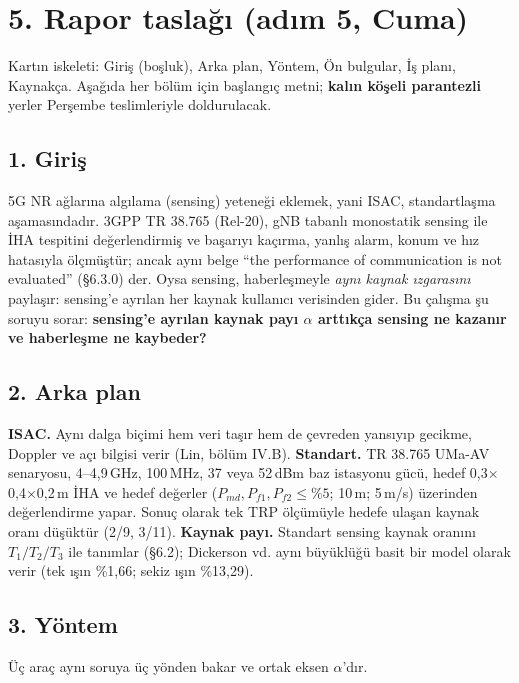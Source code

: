 \documentclass[10.5pt,a4paper]{article}
\begin{document}
\section*{5. Rapor taslağı (adım 5, Cuma)}
Kartın iskeleti: Giriş (boşluk), Arka plan, Yöntem, Ön bulgular, İş planı, Kaynakça. Aşağıda her bölüm için başlangıç metni; \textbf{kalın köşeli parantezli} yerler Perşembe teslimleriyle doldurulacak.

\subsection*{1. Giriş}
5G NR ağlarına algılama (sensing) yeteneği eklemek, yani ISAC, standartlaşma aşamasındadır. 3GPP TR 38.765 (Rel-20), gNB tabanlı monostatik sensing ile İHA tespitini değerlendirmiş ve başarıyı kaçırma, yanlış alarm, konum ve hız hatasıyla ölçmüştür; ancak aynı belge ``the performance of communication is not evaluated'' (§6.3.0) der. Oysa sensing, haberleşmeyle \emph{aynı kaynak ızgarasını} paylaşır: sensing'e ayrılan her kaynak kullanıcı verisinden gider. Bu çalışma şu soruyu sorar: \textbf{sensing'e ayrılan kaynak payı $\alpha$ arttıkça sensing ne kazanır ve haberleşme ne kaybeder?}

\subsection*{2. Arka plan}
\textbf{ISAC.} Aynı dalga biçimi hem veri taşır hem de çevreden yansıyıp gecikme, Doppler ve açı bilgisi verir (Lin, bölüm IV.B). \textbf{Standart.} TR 38.765 UMa-AV senaryosu, 4--4,9\,GHz, 100\,MHz, 37 veya 52\,dBm baz istasyonu gücü, hedef 0,3$\times$0,4$\times$0,2\,m İHA ve hedef değerler ($P_{md},P_{f1},P_{f2}\le\%5$; 10\,m; 5\,m/s) üzerinden değerlendirme yapar. Sonuç olarak tek TRP ölçümüyle hedefe ulaşan kaynak oranı düşüktür (2/9, 3/11). \textbf{Kaynak payı.} Standart sensing kaynak oranını $T_1/T_2/T_3$ ile tanımlar (§6.2); Dickerson vd. aynı büyüklüğü basit bir model olarak verir (tek ışın \%1,66; sekiz ışın \%13,29).

\subsection*{3. Yöntem}
Üç araç aynı soruya üç yönden bakar ve ortak eksen $\alpha$'dır.
\end{document}
